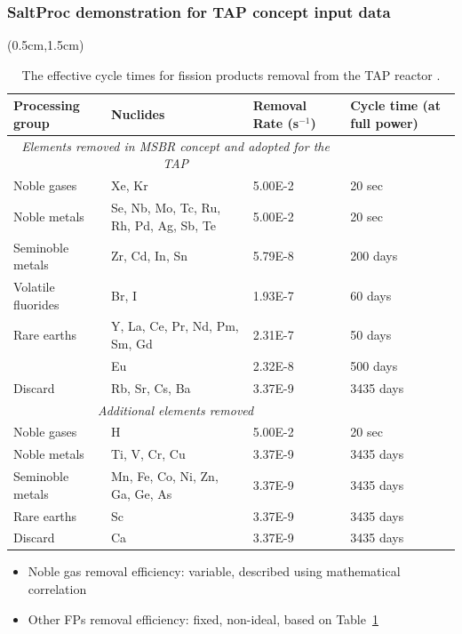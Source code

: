 \begin{frame}
\frametitle{SaltProc demonstration for TAP concept input data}
	  \begin{textblock*}{12.5cm}(0.5cm,1.5cm) %
\begin{table}[htbp!]
	\fontsize{6}{9}\selectfont
	\centering
	\caption{The effective cycle times for fission products removal  from the 
		\gls{TAP} reactor \cite{betzler_implementation_2017}.}
	\begin{tabular}{p{} p{} p{} 
			p{}}
		\hline 
		\textbf{Processing group} & \qquad\qquad\qquad \textbf{Nuclides} & 
		\textbf{Removal Rate (s$^{-1}$)} & \textbf{Cycle time (at full power)} 
		\\ \hline 
		\multicolumn{3}{c}{\textit{Elements removed in \gls{MSBR} concept and 
				adopted for the \gls{TAP}} \cite{robertson_conceptual_1971}} \\
		Noble gases & Xe, Kr								  & 5.00E-2 & 20 
		sec \\
		Noble metals & Se, Nb, Mo, Tc, Ru, Rh, Pd, Ag, Sb, Te & 5.00E-2 & 20 
		sec \\
		Seminoble metals & Zr, Cd, In, Sn	  				  & 5.79E-8 & 200 
		days\\
		Volatile fluorides & Br, I 							  & 1.93E-7 & 60 
		days\\
		Rare earths & Y, La, Ce, Pr, Nd, Pm, Sm, Gd           & 2.31E-7 & 50 
		days\\
		\qquad & Eu & 2.32E-8 & 500 days \\
		Discard & Rb, Sr, Cs, Ba & 3.37E-9 & 3435 days \\
		\hline
		\multicolumn{3}{c}{\textit{Additional elements removed} 
			\cite{betzler_implementation_2017, 
			transatomic_power_corporation_neutronics_2016}} \\
		Noble gases & H								  	& 5.00E-2 & 20 
		sec    \\
		Noble metals & Ti, V, Cr, Cu						& 3.37E-9 & 3435 
		days \\
		Seminoble metals & Mn, Fe, Co, Ni, Zn, Ga, Ge, As   & 3.37E-9 & 3435 
		days \\
		Rare earths & Sc									& 3.37E-9 & 3435 
		days \\
		Discard & Ca										& 3.37E-9 & 3435 
		days \\
		\hline
	\end{tabular}
	\label{tab:reprocessing_list}
\end{table}
	\begin{itemize}
		\item Noble gas removal efficiency: variable, described using 
		mathematical 
		correlation
		\item Other FPs removal efficiency: fixed, non-ideal, based on 
		Table~\ref{tab:reprocessing_list}
	\end{itemize}
	\end{textblock*}
\end{frame}


